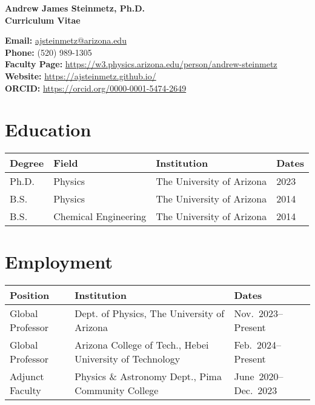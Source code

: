 \documentclass[11pt]{article}
\begin{document}
\begin{center}
    {\Large\textbf{Andrew James Steinmetz, Ph.D.}}\\[0.5em]
    {\large\textbf{Curriculum Vitae}}
\end{center}

\noindent
\textbf{Email:} \href{mailto:ajsteinmetz@arizona.edu}{ajsteinmetz@arizona.edu}\\[0.3em]
\textbf{Phone:} (520) 989-1305\\[0.3em]
\textbf{Faculty Page:} \href{https://w3.physics.arizona.edu/person/andrew-steinmetz}{https://w3.physics.arizona.edu/person/andrew-steinmetz}\\[0.3em]
\textbf{Website:} \href{https://ajsteinmetz.github.io/}{https://ajsteinmetz.github.io/}\\[0.3em]
\textbf{ORCID:} \href{https://orcid.org/0000-0001-5474-2649}{https://orcid.org/0000-0001-5474-2649}

\section*{Education}
{\normalsize
\begin{tabular}{@{}p{2.8cm} p{4.0cm} p{5.0cm} p{3.2cm}@{}}
\toprule
\textbf{Degree} & \textbf{Field} & \textbf{Institution} & \textbf{Dates} \\
\midrule
Ph.D. & Physics             & The University of Arizona & 2023 \\
B.S.   & Physics             & The University of Arizona & 2014 \\
B.S.   & Chemical Engineering& The University of Arizona & 2014 \\
\bottomrule
\end{tabular}
}

\section*{Employment}
{\normalsize
\begin{tabular}{@{}p{2.8cm} p{9.5cm} p{3.2cm}@{}}
\toprule
\textbf{Position} & \textbf{Institution} & \textbf{Dates} \\
\midrule
Global Professor   & Dept. of Physics, The University of Arizona            & {\footnotesize Nov.~2023--Present} \\
Global Professor   & Arizona College of Tech., Hebei University of Technology       & {\footnotesize Feb.~2024--Present} \\
Adjunct Faculty    & Physics \& Astronomy Dept., Pima Community College               & {\footnotesize June~2020--Dec.~2023} \\
\bottomrule
\end{tabular}
}
\end{document}
